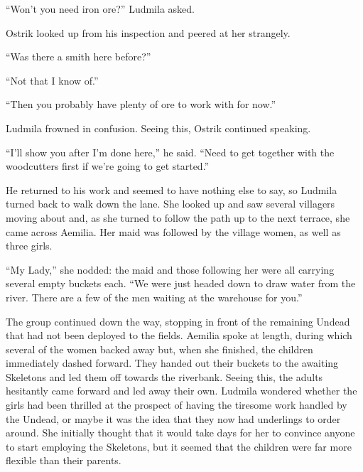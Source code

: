  

“Won’t you need iron ore?” Ludmila asked.

 

Ostrik looked up from his inspection and peered at her strangely.

 

“Was there a smith here before?”

 

“Not that I know of.”

 

“Then you probably have plenty of ore to work with for now.”

 

Ludmila frowned in confusion. Seeing this, Ostrik continued speaking.

 

“I’ll show you after I’m done here,” he said. “Need to get together with the woodcutters first if we’re going to get started.”

 

He returned to his work and seemed to have nothing else to say, so Ludmila turned back to walk down the lane. She looked up and saw several villagers moving about and, as she turned to follow the path up to the next terrace, she came across Aemilia. Her maid was followed by the village women, as well as three girls.

 

“My Lady,” she nodded: the maid and those following her were all carrying several empty buckets each. “We were just headed down to draw water from the river. There are a few of the men waiting at the warehouse for you.”

 

The group continued down the way, stopping in front of the remaining Undead that had not been deployed to the fields. Aemilia spoke at length, during which several of the women backed away but, when she finished, the children immediately dashed forward. They handed out their buckets to the awaiting Skeletons and led them off towards the riverbank. Seeing this, the adults hesitantly came forward and led away their own. Ludmila wondered whether the girls had been thrilled at the prospect of having the tiresome work handled by the Undead, or maybe it was the idea that they now had underlings to order around. She initially thought that it would take days for her to convince anyone to start employing the Skeletons, but it seemed that the children were far more flexible than their parents.

 

